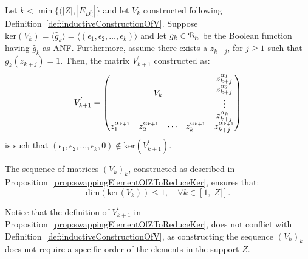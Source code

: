 \documentclass[11pt]{llncs}
\begin{document}
\begin{proposition}\label{prop:swappingElementOfZToReduceKer}
    Let $k < \min\{(|Z|, |E_{D_n^n}|\}$ and let $V_k$ constructed following Definition~\ref{def:inductiveConstructionOfV}. 
    Suppose $\text{ker}(V_k) = \langle \hat{g}_k \rangle=\langle (\epsilon_1, \epsilon_2, \dots, \epsilon_k) \rangle $ and let $g_k\in \mathcal{B}_{n}$ be the Boolean function having $\hat{g}_k$ as ANF. 
    Furthermore, assume there exists a $z_{k+j}$, for $j\geq 1$ such that $g_k(z_{k+j}) = 1$. Then, the matrix $V^{'}_{k+1}$ constructed as:
    \begin{align*}
        V^{'}_{k+1} = 
        \begin{pmatrix}
        \multicolumn{4}{c}{\multirow{4}{*}{$V_{k}$}} & z_{k+j}^{\alpha_{1}}\\
        & & & & z_{k+j}^{\alpha_{2}}\\
        & & & & \vdots\\
        & & & & z_{k+j}^{\alpha_{k}}\\
        z_{1}^{\alpha_{k+1}} & z_{2}^{\alpha_{k+1}}& \cdots & z_{k}^{\alpha_{k+1}} & z_{k+j}^{\alpha_{k+1}}
    \end{pmatrix}
    \end{align*}
    is such that $(\epsilon_1, \epsilon_2, \dots, \epsilon_k, 0) \not\in \text{ker}(V^{'}_{k+1})$.
\end{proposition}

\begin{proposition}\label{prop:upperBoundOnRightKernel}
    The sequence of matrices \( (V_k)_k \), constructed as described in Proposition~\ref{prop:swappingElementOfZToReduceKer}, ensures that:    
    \[
    \text{dim}\left(\text{ker}\left(V_k\right)\right) \leq 1, \quad \forall k \in [1, |Z|].
    \]
\end{proposition}

\begin{remark}
    Notice that the definition of $V^{'}_{k+1}$ in Proposition~\ref{prop:swappingElementOfZToReduceKer}, does not conflict with Definition~\ref{def:inductiveConstructionOfV}, as constructing the sequence $(V_{k})_k$ does not require a specific order of the elements in the support $Z$.   
\end{remark}
\end{document}
